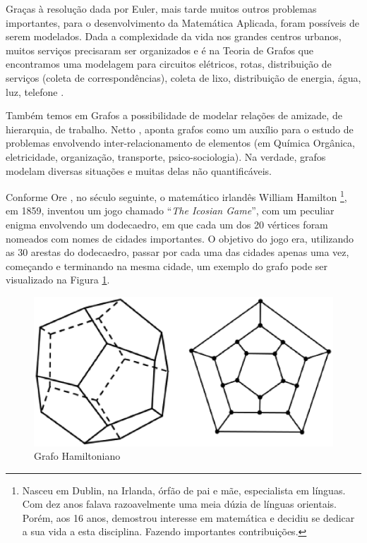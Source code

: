 Graças à resolução dada por Euler, mais tarde muitos outros problemas importantes, para o desenvolvimento da Matemática Aplicada, foram possíveis de serem modelados. Dada a complexidade da vida nos grandes centros urbanos, muitos serviços precisaram ser organizados e é na Teoria de Grafos que encontramos uma modelagem para circuitos elétricos, rotas, distribuição de serviços (coleta de correspondências), coleta de lixo, distribuição de energia, água, luz, telefone \cite{Mello:2007}.

Também temos em Grafos a possibilidade de modelar relações de amizade, de hierarquia, de trabalho. Netto \cite{Netto:2012}, aponta grafos como um auxílio para o estudo de problemas envolvendo inter-relacionamento de elementos (em Química Orgânica, eletricidade, organização, transporte, psico-sociologia). Na verdade, grafos modelam diversas situações e muitas delas não quantificáveis.

Conforme Ore \cite{Ore:1963}, no século seguinte, o matemático irlandês William Hamilton \footnote{Nasceu em Dublin, na Irlanda, órfão de pai e mãe, especialista em línguas. Com dez anos falava razoavelmente uma meia dúzia de línguas orientais. Porém, aos 16 anos, demostrou interesse em matemática e decidiu se dedicar a sua vida a esta disciplina. Fazendo importantes contribuições.}, em 1859, inventou um jogo chamado ``\textit{The Icosian Game}'', com um peculiar enigma envolvendo um dodecaedro, em que cada um dos 20 vértices foram nomeados com nomes de cidades importantes. O objetivo do jogo era, utilizando as 30 arestas do dodecaedro, passar por cada uma das cidades apenas uma vez, começando e terminando na mesma cidade, um exemplo do grafo pode ser visualizado na Figura \ref{grafo_hamiltoniano}.

\begin{figure}[!h]
	\centering
	\includegraphics[scale=0.5]{figuras/capitulo1/grafo_hamiltoniano.eps}
	\caption{Grafo Hamiltoniano}
	\label{grafo_hamiltoniano}
\end{figure}

